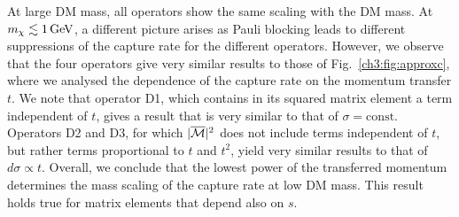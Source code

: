 At large DM mass, all operators show the same scaling with the DM mass. At  $m_\chi\lesssim1{\rm \,GeV}$, a different picture arises as Pauli blocking leads to different suppressions of the capture rate for the different operators. However, we observe that the four operators give very similar results to those of Fig.~\ref{ch3:fig:approxc}, where we analysed the dependence of the capture rate on the momentum transfer $t$.  We note that operator D1, which contains in its squared matrix element a term independent of $t$, gives a result that is very similar to that of $\sigma=\mathrm{const}$. Operators D2 and D3, for which $|\overline{\mathcal M}|^2$ does not include terms independent of $t$, but rather terms proportional to $t$ and $t^2$, yield very similar results to that of $d\sigma\propto t$. 
Overall, we conclude that the lowest power of the transferred momentum determines the mass scaling of the capture rate at low DM  mass.
This result holds true for matrix elements that depend also on $s$. 


